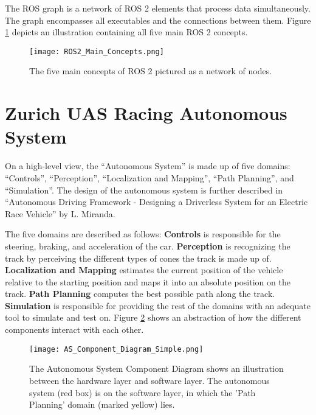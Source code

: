 \pagebreak

The ROS graph is a network of ROS 2 elements that process data simultaneously. The graph encompasses all executables and the connections between them. Figure \ref{fig:ROS 2 main concepts} depicts an illustration containing all five main ROS 2 concepts.

\begin{figure}[H]
    \centering
    \texttt{[image: ROS2\_Main\_Concepts.png]}
    \caption{The five main concepts of ROS 2 pictured as a network of nodes.}
    \label{fig:ROS 2 main concepts}
\end{figure}

\pagebreak

\section{Zurich UAS Racing Autonomous System} \label{sec:Zurich UAS Racing Autonomous System}
On a high-level view, the ``Autonomous System'' is made up of five domains: ``Controls'', ``Perception'', ``Localization and Mapping'', ``Path Planning'', and ``Simulation''. The design of the autonomous system is further described in ``Autonomous Driving Framework - Designing a Driverless System for an Electric Race Vehicle'' by L. Miranda. \cite{zur_autonomous_driving_framework}

The five domains are described as follows:
\textbf{Controls} is responsible for the steering, braking, and acceleration of the car.
\textbf{Perception} is recognizing the track by perceiving the different types of cones the track is made up of.
\textbf{Localization and Mapping} estimates the current position of the vehicle relative to the starting position and maps it into an absolute position on the track.
\textbf{Path Planning} computes the best possible path along the track.
\textbf{Simulation} is responsible for providing the rest of the domains with an adequate tool to simulate and test on.
Figure \ref{fig:AS Component Diagram} shows an abstraction of how the different components interact with each other.

\begin{figure}[H]
    \centering
    \texttt{[image: AS\_Component\_Diagram\_Simple.png]}
    \caption{The Autonomous System Component Diagram shows an illustration between the hardware layer and software layer. The autonomous system (red box) is on the software layer, in which the 'Path Planning' domain (marked yellow) lies.}
    \label{fig:AS Component Diagram}
\end{figure}

